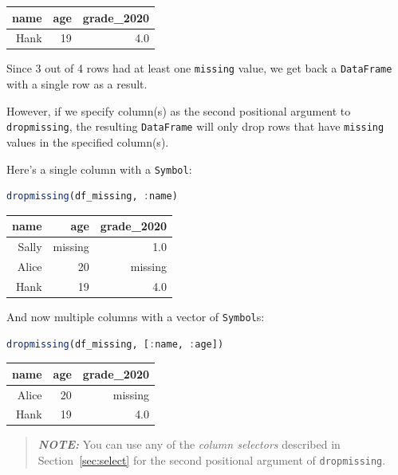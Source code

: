 \documentclass[
  notoc %
]{tufte-book}
\newcommand{\passthrough}[1]{#1}
\begin{document}
\begin{longtable}[]{@{}rrr@{}}
\toprule
name & age & grade\_2020 \\
\midrule
\endhead
Hank & 19 & 4.0 \\
\bottomrule
\end{longtable}

Since 3 out of 4 rows had at least one \passthrough{\lstinline!missing!}
value, we get back a \passthrough{\lstinline!DataFrame!} with a single
row as a result.

However, if we specify column(s) as the second positional argument to
\passthrough{\lstinline!dropmissing!}, the resulting
\passthrough{\lstinline!DataFrame!} will only drop rows that have
\passthrough{\lstinline!missing!} values in the specified column(s).

Here's a single column with a \passthrough{\lstinline!Symbol!}:

\begin{lstlisting}[language=Julia]
dropmissing(df_missing, :name)
\end{lstlisting}

\begin{longtable}[]{@{}rrr@{}}
\toprule
name & age & grade\_2020 \\
\midrule
\endhead
Sally & missing & 1.0 \\
Alice & 20 & missing \\
Hank & 19 & 4.0 \\
\bottomrule
\end{longtable}

And now multiple columns with a vector of
\passthrough{\lstinline!Symbol!}s:

\begin{lstlisting}[language=Julia]
dropmissing(df_missing, [:name, :age])
\end{lstlisting}

\begin{longtable}[]{@{}rrr@{}}
\toprule
name & age & grade\_2020 \\
\midrule
\endhead
Alice & 20 & missing \\
Hank & 19 & 4.0 \\
\bottomrule
\end{longtable}

\begin{quote}
\textbf{\emph{NOTE:}} You can use any of the \emph{column selectors}
described in Section~\ref{sec:select} for the second positional argument
of \passthrough{\lstinline!dropmissing!}.
\end{quote}
\end{document}
